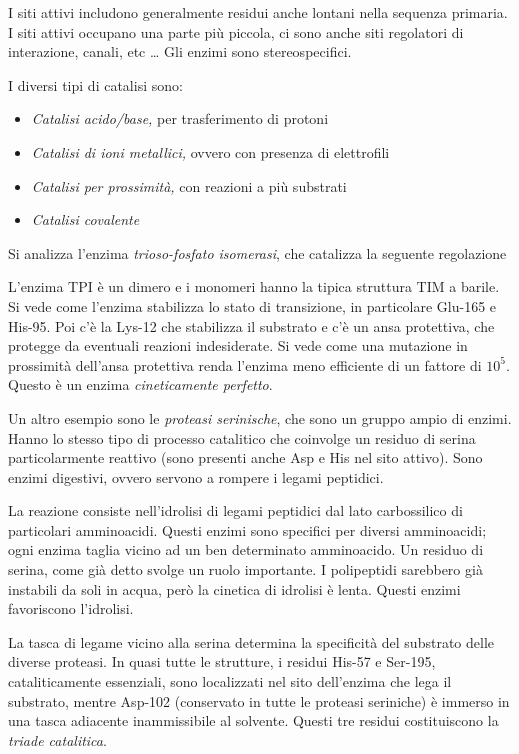 I siti attivi includono generalmente residui anche lontani nella sequenza primaria. I siti attivi occupano una parte più piccola, ci sono anche siti regolatori di interazione, canali, etc \ldots{}
Gli enzimi sono stereospecifici.

I diversi tipi di catalisi sono:
\begin{itemize}
\item \emph{Catalisi acido/base,} per trasferimento di protoni
\item \emph{Catalisi di ioni metallici,} ovvero con presenza di elettrofili
\item \emph{Catalisi per prossimità,} con reazioni a più substrati
\item \emph{Catalisi covalente}
\end{itemize}

Si analizza l'enzima \emph{trioso-fosfato isomerasi}, che catalizza la seguente regolazione

L'enzima TPI è un dimero e i monomeri hanno la tipica struttura TIM a barile. Si vede come l'enzima stabilizza lo stato di transizione, in particolare Glu-165 e His-95. Poi c'è la Lys-12 che stabilizza il substrato e c'è un ansa protettiva, che protegge da eventuali reazioni indesiderate.
Si vede come una mutazione in prossimità dell'ansa protettiva renda l'enzima meno efficiente di un fattore di $10^{5}$. Questo è un enzima \emph{cineticamente perfetto}.

Un altro esempio sono le \emph{proteasi serinische}, che sono un gruppo ampio di enzimi. Hanno lo stesso tipo di processo catalitico che coinvolge un residuo di serina particolarmente reattivo (sono presenti anche Asp e His nel sito attivo). Sono enzimi digestivi, ovvero servono a rompere i legami peptidici.

La reazione consiste nell'idrolisi di legami peptidici dal lato carbossilico di particolari amminoacidi. Questi enzimi sono specifici per diversi amminoacidi; ogni enzima taglia vicino ad un ben determinato amminoacido.
Un residuo di serina, come già detto svolge un ruolo importante.
I polipeptidi sarebbero già instabili da soli in acqua, però la cinetica di idrolisi è lenta. Questi enzimi favoriscono l'idrolisi.

La tasca di legame vicino alla serina determina la specificità del substrato delle diverse proteasi. In quasi tutte le strutture, i residui His-57 e Ser-195, cataliticamente essenziali, sono localizzati nel sito dell'enzima che lega il substrato, mentre Asp-102 (conservato in tutte le proteasi seriniche) è immerso in una tasca adiacente inammissibile al solvente. Questi tre residui costituiscono la \emph{triade catalitica}.

